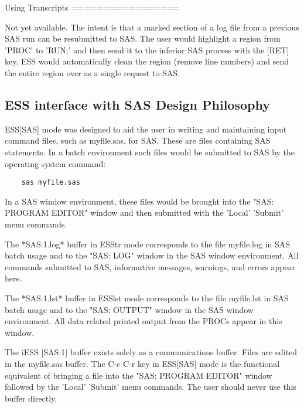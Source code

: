 \documentclass{article}
\begin{document}
Using Transcripts
=================

Not yet available.  The intent is that a marked section of a log file
from a previous SAS run can be resubmitted to SAS.  The user would
highlight a region from 'PROC' to 'RUN;' and then send it to the
inferior SAS process with the [RET] key.  ESS would automatically
clean the region (remove line numbers) and send the entire region over
as a single request to SAS.


\subsection{ESS interface with SAS Design Philosophy}
\label{sec:SAS:phil}

ESS[SAS] mode was designed to aid the user in writing and maintaining
input command files, such as myfile.sas, for SAS.  These are files
containing SAS statements.  In a batch environment such files would be
submitted to SAS by the operating system command:
\begin{verbatim}
    sas myfile.sas
\end{verbatim}
In a SAS window environment, these files would be brought into the
"SAS: PROGRAM EDITOR" window and then submitted with the 'Local' 'Submit'
menu commands.

The *SAS:1.log* buffer in ESStr mode corresponds to the file
myfile.log in SAS batch usage and to the "SAS: LOG" window in the SAS
window environment.  All commands submitted to SAS, informative
messages, warnings, and errors appear here.

The *SAS:1.lst* buffer in ESSlst mode corresponds to the file
myfile.lst in SAS batch usage and to the "SAS: OUTPUT" window in the
SAS window environment.  All data related printed output from the
PROCs appear in this window.

The iESS [SAS:1] buffer exists solely as a communications buffer.
Files are edited in the myfile.sas buffer.  The C-c C-r key in
ESS[SAS] mode is the functional equivalent of bringing a file into the
"SAS: PROGRAM EDITOR" window followed by the 'Local' 'Submit' menu
commands.  The user should never use this buffer directly.
\end{document}
